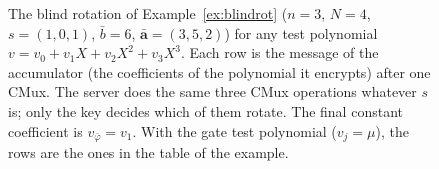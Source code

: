 \begin{figure}[!htb]
\centering

\caption{The blind rotation of Example~\ref{ex:blindrot} ($n=3$, $N=4$,
$s=(1,0,1)$, $\bar b=6$, $\bar{\mathbf a}=(3,5,2)$) for any test polynomial
$v=v_0+v_1X+v_2X^2+v_3X^3$. Each row is the message of the accumulator (the
coefficients of the polynomial it encrypts) after one CMux. The server does
the same three CMux operations whatever $s$ is; only the key decides which of
them rotate. The final constant coefficient is $v_{\bar\varphi}=v_1$. With the
gate test polynomial ($v_j=\mu$), the rows are the ones in the table of the
example.}
\label{fig:blindrot}
\end{figure}
